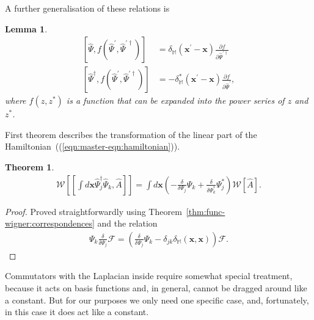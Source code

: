 \documentclass[12pt,aip,jmp,amssymb,amsmath]{revtex4-1}
\newtheorem{theorem}{Theorem}
\newtheorem{lemma}{Lemma}
\begin{document}
A further generalisation of these relations is

\begin{lemma}
\label{lmm:func-operators:functional-commutators}
    \begin{equation*}\begin{split}
        \left[ \hat{\Psi}, f( \hat{\Psi}^\prime, \hat{\Psi}^{\prime\dagger} ) \right]
        & = \delta_{\mathbb{M}} (\boldsymbol{x}^\prime - \boldsymbol{x}) \frac{\partial f}{\partial \hat{\Psi}^{\prime\dagger}} \\
        \left[ \hat{\Psi}^\dagger, f( \hat{\Psi}^\prime, \hat{\Psi}^{\prime\dagger} ) \right]
        & = -\delta_{\mathbb{M}}^* (\boldsymbol{x}^\prime - \boldsymbol{x}) \frac{\partial f}{\partial \hat{\Psi}^\prime},
    \end{split}\end{equation*}
    where $f(z, z^*)$ is a function that can be expanded into the power series of $z$ and $z^*$.
\end{lemma}

First theorem describes the transformation of the linear part of the Hamiltonian~((\ref{eqn:master-eqn:hamiltonian})).

\begin{theorem}
\label{thm:transformations:w-commutator1}
    \begin{equation*}\begin{split}
        \mathcal{W} \left[ [\int d\boldsymbol{x} \hat{\Psi}_j^\dagger \hat{\Psi}_k, \hat{A}] \right]
        = \int d\boldsymbol{x} \left(
            - \frac{\delta}{\delta \Psi_j} \Psi_k
            + \frac{\delta}{\delta \Psi_k^*} \Psi_j^*
        \right) \mathcal{W}[\hat{A}].
    \end{split}\end{equation*}
\end{theorem}
\begin{proof}
Proved straightforwardly using Theorem~\ref{thm:func-wigner:correspondences} and the relation
\begin{equation}\begin{split}
    \Psi_k \frac{\delta}{\delta \Psi_j} \mathcal{F}
    = \left(
        \frac{\delta}{\delta \Psi_j} \Psi_k
        - \delta_{jk} \delta_{\mathbb{M}}(\boldsymbol{x}, \boldsymbol{x})
    \right) \mathcal{F}.
\end{split}\end{equation}
\end{proof}

Commutators with the Laplacian inside require somewhat special treatment, because it acts on basis functions and, in general, cannot be dragged around like a constant.
But for our purposes we only need one specific case, and, fortunately, in this case it does act like a constant.
\end{document}
